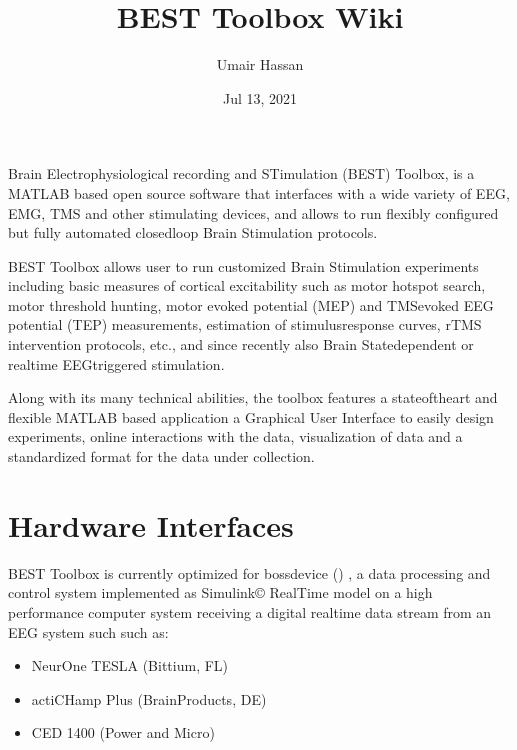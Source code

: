 \documentclass[letterpaper,10pt,english]{sphinxmanual}
\title{BEST Toolbox Wiki}
\date{Jul 13, 2021}
\author{Umair Hassan}
\begin{document}
\pagestyle{empty}
\sphinxmaketitle
\pagestyle{plain}
\sphinxtableofcontents
\pagestyle{normal}
\label{\detokenize{index::doc}}


\sphinxAtStartPar
Brain Electrophysiological recording and STimulation (BEST) Toolbox, is a MATLAB based open source software that interfaces with a wide variety of EEG, EMG, TMS and other stimulating devices, and allows to run flexibly configured but fully automated closed\sphinxhyphen{}loop Brain Stimulation protocols.

\sphinxAtStartPar
BEST Toolbox allows user to run customized Brain Stimulation experiments including basic measures of cortical excitability such as motor hotspot search, motor threshold hunting, motor evoked potential (MEP) and TMS\sphinxhyphen{}evoked EEG potential (TEP) measurements, estimation of stimulus\sphinxhyphen{}response curves, rTMS intervention protocols, etc., and since recently also Brain State\sphinxhyphen{}dependent or real\sphinxhyphen{}time EEG\sphinxhyphen{}triggered stimulation.

\sphinxAtStartPar
Along with its many technical abilities, the toolbox features a state\sphinxhyphen{}of\sphinxhyphen{}the\sphinxhyphen{}art and flexible MATLAB based application \textendash{} a Graphical User Interface to easily design experiments, online interactions with the data, visualization of data and a standardized format for the data under collection.


\chapter{Hardware Interfaces}
\label{\detokenize{index:hardware-interfaces}}
\sphinxAtStartPar
BEST Toolbox is currently optimized for bossdevice  () , a data processing and control system implemented as Simulink© Real\sphinxhyphen{}Time model on a high performance computer system receiving a digital real\sphinxhyphen{}time data stream from an EEG system such such as:
\begin{itemize}
\item {} 
\sphinxAtStartPar
NeurOne TESLA (Bittium, FL)

\item {} 
\sphinxAtStartPar
actiCHamp Plus (BrainProducts, DE)

\item {} 
\sphinxAtStartPar
CED 1400 (Power and Micro)

\end{itemize}
\end{document}
